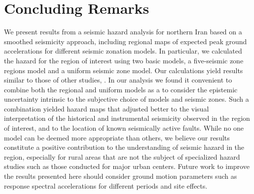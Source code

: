 
\section{Concluding Remarks}

We present results from a seismic hazard analysis for northern Iran based on a smoothed seismicity approach, including regional maps of expected peak ground accelerations for different seismic zonation models. In particular, we calculated the hazard for the region of interest using two basic models, a five-seismic zone regions model and a uniform seismic zone model. Our calculations yield results similar to those of other studies, . In our analysis we found it convenient to combine both the regional and uniform models as a  to consider the epistemic uncertainty intrinsic to the subjective choice of models and seismic zones. Such a combination yielded hazard maps that adjusted better to the visual interpretation of the historical and instrumental seismicity observed in the region of interest, and to the location of known seismically active faults. While no one model can be deemed more appropriate than others, we believe our results constitute a positive contribution to the understanding of seismic hazard in the region, especially for rural areas that are not the subject of specialized hazard studies such as those conducted for major urban centers. Future work to improve the results presented here should consider  ground motion parameters such as response spectral accelerations for different periods and site effects.

